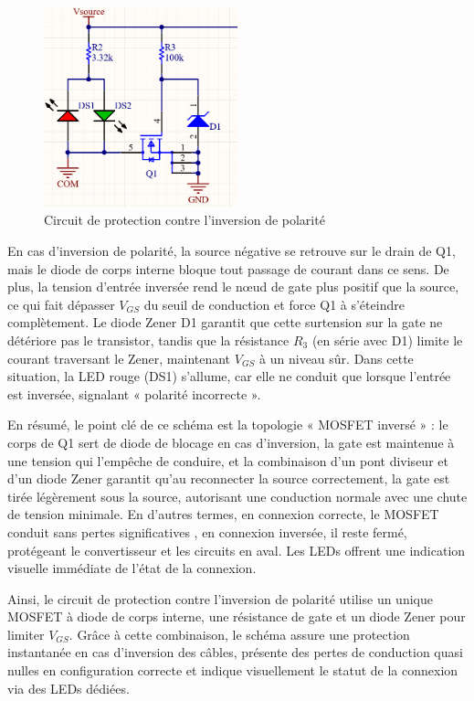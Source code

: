 \begin{figure}[H]
    \centering
    \includegraphics[width=0.5\textwidth]{figures/ReversePolarity.png}
    \caption{Circuit de protection contre l'inversion de polarité}
    \label{fig:reverse_polarity_protection}
\end{figure}

En cas d'inversion de polarité, la source négative se retrouve sur le drain de Q1, mais le diode de corps interne bloque tout passage de courant dans ce sens. De plus, la tension d'entrée inversée rend le nœud de gate plus positif que la source, ce qui fait dépasser \(V_{GS}\) du seuil de conduction et force Q1 à s'éteindre complètement. Le diode Zener D1 garantit que cette surtension sur la gate ne détériore pas le transistor, tandis que la résistance \(R_3\) (en série avec D1) limite le courant traversant le Zener, maintenant \(V_{GS}\) à un niveau sûr. Dans cette situation, la LED rouge (DS1) s'allume, car elle ne conduit que lorsque l'entrée est inversée, signalant « polarité incorrecte ».

En résumé, le point clé de ce schéma est la topologie « MOSFET inversé » : le corps de Q1 sert de diode de blocage en cas d'inversion, la gate est maintenue à une tension qui l'empêche de conduire, et la combinaison d'un pont diviseur et d'un diode Zener garantit qu'au reconnecter la source correctement, la gate est tirée légèrement sous la source, autorisant une conduction normale avec une chute de tension minimale. En d'autres termes, en connexion correcte, le MOSFET conduit sans pertes significatives , en connexion inversée, il reste fermé, protégeant le convertisseur et les circuits en aval. Les LEDs offrent une indication visuelle immédiate de l'état de la connexion.

Ainsi, le circuit de protection contre l'inversion de polarité utilise un unique MOSFET à diode de corps interne, une résistance de gate et un diode Zener pour limiter \(V_{GS}\). Grâce à cette combinaison, le schéma assure une protection instantanée en cas d'inversion des câbles, présente des pertes de conduction quasi nulles en configuration correcte et indique visuellement le statut de la connexion via des LEDs dédiées.


